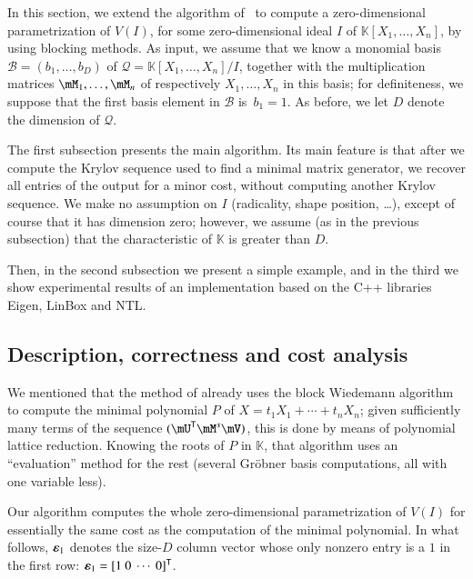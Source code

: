 \documentclass[final,1p,times,authoryear]{elsarticle}
\newcommand{\col}[1]{\bm{\MakeLowercase{#1}}} %
\newcommand{\basis}{\mathscr{B}}
\newcommand{\minpoly}{P}
\newcommand{\lf}{X}
\newcommand{\residueI}{\mathscr{Q}}
\newcommand{\trsp}[1]{#1^{\mathsf{T}}} %
\def\K{\mathbb{K}}
\def\K {\ensuremath{\mathbb{K}}}
\newcommand{\mUt}{\trsp{\mU}}
\begin{document}
In this section, we extend the algorithm of~\citep{BoSaSc03} to compute
a zero-dimensional parametrization of $V(I)$, for some
zero-dimensional ideal $I$ of $\K[X_1,\dots,X_n]$, by using blocking
methods. As input, we assume that we know a monomial basis
$\basis=(b_1,\dots,b_D)$ of $\residueI=\K[X_1,\dots,X_n]/I$, together
with the multiplication matrices $\mM_1,\dots,\mM_n$ of respectively
$X_1,\dots,X_n$ in this basis; for definiteness, we suppose that the
first basis element in $\basis$ is~$b_1=1$. As before, we let $D$ denote the
dimension of $\residueI$.

The first subsection presents the main algorithm. Its main feature is
that after we compute the Krylov sequence used to find a minimal
matrix generator, we recover all entries of the output for a minor
cost, without computing another Krylov sequence. We make no assumption
on $I$ (radicality, shape position, \dots), except of course that it
has dimension zero; however, we assume (as in the previous subsection)
that the characteristic of $\K$ is greater than $D$. 

Then, in the second subsection we present a simple example, and in the third we
show experimental results of an implementation based on the C++ libraries
Eigen, LinBox and NTL.


\subsection{Description, correctness and cost analysis}\label{ssec:mainalgo}

We mentioned that the method of \citet{Steel15} already uses the block
Wiedemann algorithm to compute the minimal polynomial $\minpoly$ of
$\lf=t_1 X_1 + \cdots + t_n X_n$; {given sufficiently many terms of the
  sequence $(\mUt \mM^s \mV)$, this is done by means of polynomial
  lattice reduction}. Knowing the roots of $\minpoly$ in $\K$, that
algorithm uses an ``evaluation'' method for the rest (several
Gr\"obner basis computations, all with one variable less).

Our algorithm computes the whole zero-dimensional parametrization of
$V(I)$ for essentially the same cost as the computation of the minimal
polynomial. In what follows, $\col{\varepsilon}_1$ denotes the
size-$D$ column vector whose only nonzero entry is a $1$ in the first
row: $\col{\varepsilon}_1 =\trsp{[1~0~\cdots~0]}$.
\end{document}
